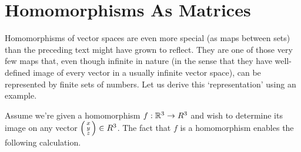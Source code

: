 \section{Homomorphisms As Matrices}
\label{sec:homomorphisms-as-matrices}

Homomorphisms of vector spaces are even more special (as maps between sets) than
the preceding text might have grown to reflect. They are one of those very few
maps that, even though infinite in nature (in the sense that they have
well-defined image of every vector in a usually infinite vector space), can be
represented by finite sets of numbers. Let us derive this `representation' using
an example.

Assume we're given a homomorphism $f:\mathbb{R}^3 \to R^3$ and wish to determine its
image on any vector $\begin{psmallmatrix} x \\ y \\ z \end{psmallmatrix} \in
R^3$. The fact that $f$ is a homomorphism enables the following calculation.
